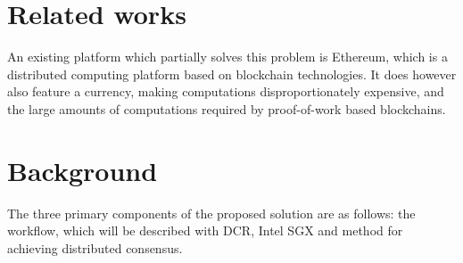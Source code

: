 \documentclass[12pt]{article}
\begin{document}
	\section{Related works}

	An existing platform which partially solves this problem is Ethereum\cite{ethereum-white-paper}, which is a distributed computing platform based on blockchain technologies.
	It does however also feature a currency, making computations disproportionately expensive, and the large amounts of computations required by proof-of-work based blockchains.

	\section{Background}

	The three primary components of the proposed solution are as follows: the workflow, which will be described with DCR, Intel SGX and method for achieving distributed consensus.







\end{document}

